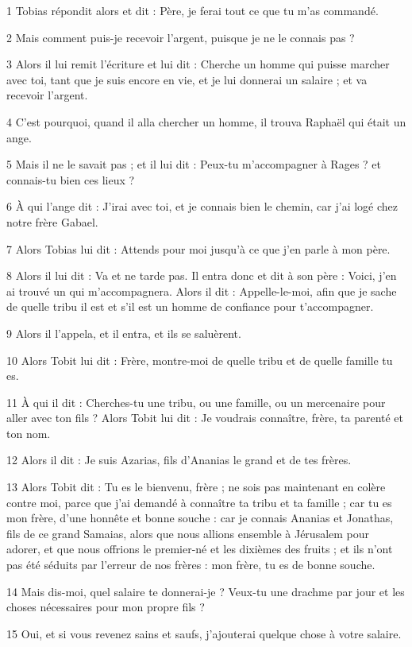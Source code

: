 \par 1 Tobias répondit alors et dit : Père, je ferai tout ce que tu m'as commandé.
\par 2 Mais comment puis-je recevoir l'argent, puisque je ne le connais pas ?
\par 3 Alors il lui remit l'écriture et lui dit : Cherche un homme qui puisse marcher avec toi, tant que je suis encore en vie, et je lui donnerai un salaire ; et va recevoir l'argent.
\par 4 C'est pourquoi, quand il alla chercher un homme, il trouva Raphaël qui était un ange.
\par 5 Mais il ne le savait pas ; et il lui dit : Peux-tu m'accompagner à Rages ? et connais-tu bien ces lieux ?
\par 6 À qui l'ange dit : J'irai avec toi, et je connais bien le chemin, car j'ai logé chez notre frère Gabael.
\par 7 Alors Tobias lui dit : Attends pour moi jusqu'à ce que j'en parle à mon père.
\par 8 Alors il lui dit : Va et ne tarde pas. Il entra donc et dit à son père : Voici, j'en ai trouvé un qui m'accompagnera. Alors il dit : Appelle-le-moi, afin que je sache de quelle tribu il est et s'il est un homme de confiance pour t'accompagner.
\par 9 Alors il l'appela, et il entra, et ils se saluèrent.
\par 10 Alors Tobit lui dit : Frère, montre-moi de quelle tribu et de quelle famille tu es.
\par 11 À qui il dit : Cherches-tu une tribu, ou une famille, ou un mercenaire pour aller avec ton fils ? Alors Tobit lui dit : Je voudrais connaître, frère, ta parenté et ton nom.
\par 12 Alors il dit : Je suis Azarias, fils d'Ananias le grand et de tes frères.
\par 13 Alors Tobit dit : Tu es le bienvenu, frère ; ne sois pas maintenant en colère contre moi, parce que j'ai demandé à connaître ta tribu et ta famille ; car tu es mon frère, d'une honnête et bonne souche : car je connais Ananias et Jonathas, fils de ce grand Samaias, alors que nous allions ensemble à Jérusalem pour adorer, et que nous offrions le premier-né et les dixièmes des fruits ; et ils n'ont pas été séduits par l'erreur de nos frères : mon frère, tu es de bonne souche.
\par 14 Mais dis-moi, quel salaire te donnerai-je ? Veux-tu une drachme par jour et les choses nécessaires pour mon propre fils ?
\par 15 Oui, et si vous revenez sains et saufs, j'ajouterai quelque chose à votre salaire.
